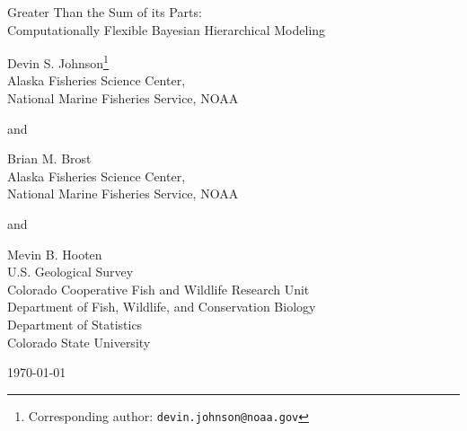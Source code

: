 \documentclass[12pt]{article}
\begin{document}

\vspace*{\fill}

\begin{center}
\setlength{\parindent}{0pt}
\renewcommand{\baselinestretch}{1.8}\normalsize

{\Large Greater Than the Sum of its Parts: \\Computationally Flexible Bayesian Hierarchical Modeling}


\renewcommand{\baselinestretch}{1.15}\normalsize 
\bigskip\bigskip

Devin S. Johnson\footnote{Corresponding author: {\tt devin.johnson@noaa.gov}}\\ 
Alaska Fisheries Science Center,\\
National Marine Fisheries Service, NOAA \medskip

and\medskip

Brian M. Brost\\
Alaska Fisheries Science Center,\\
National Marine Fisheries Service, NOAA \medskip

and\medskip

Mevin B. Hooten \\
U.S. Geological Survey\\
Colorado Cooperative Fish and Wildlife Research Unit\\
Department of Fish, Wildlife, and Conservation Biology\\
Department of Statistics\\
Colorado State University

\bigskip\bigskip

\today

\end{center}

\vspace*{\fill}

\clearpage


\end{document}
